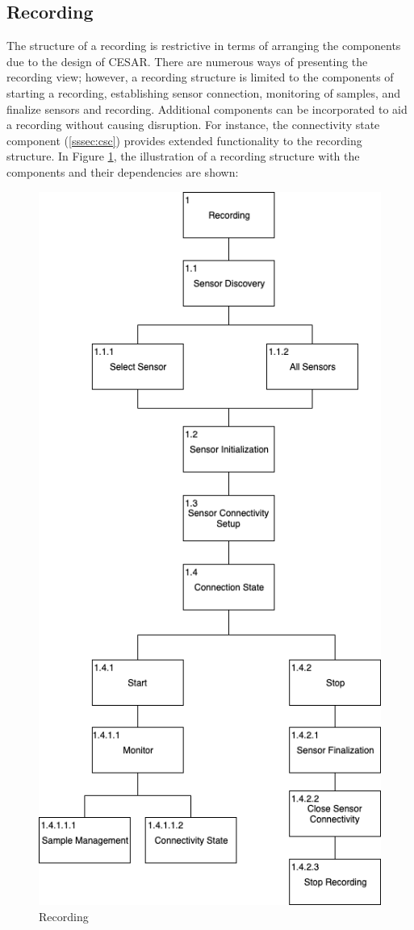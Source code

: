 
\subsection{Recording}
The structure of a recording is restrictive in terms of arranging the components due to the design of CESAR. There are numerous ways of presenting the recording view; however, a recording structure is limited to the components of starting a recording, establishing sensor connection, monitoring of samples, and finalize sensors and recording. Additional components can be incorporated to aid a recording without causing disruption. For instance, the connectivity state component (\ref{sssec:csc}) provides extended functionality to the recording structure. In Figure \ref{fig:hta_recording}, the illustration of a recording structure with the components and their dependencies are shown:

\begin{figure}
    \centering
    \includegraphics[scale=0.5]{images/Recording.png}
    \caption{Recording}
    \label{fig:hta_recording}
\end{figure}

